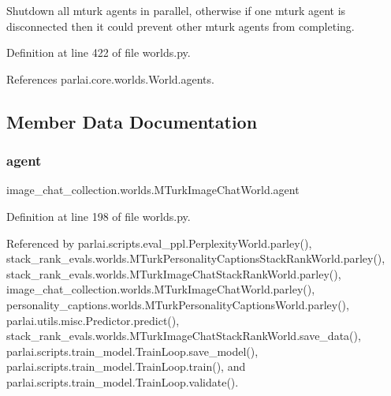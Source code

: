 \begin{DoxyVerb}Shutdown all mturk agents in parallel, otherwise if one mturk agent
is disconnected then it could prevent other mturk agents from
completing.
\end{DoxyVerb}
 

Definition at line 422 of file worlds.\+py.



References parlai.\+core.\+worlds.\+World.\+agents.



\subsection{Member Data Documentation}
\mbox{\label{classimage__chat__collection_1_1worlds_1_1MTurkImageChatWorld_a8a1e906514af9c95bb1e859400c79a7c}} 
\subsubsection{\texorpdfstring{agent}{agent}}
{\footnotesize\ttfamily image\+\_\+chat\+\_\+collection.\+worlds.\+M\+Turk\+Image\+Chat\+World.\+agent}



Definition at line 198 of file worlds.\+py.



Referenced by parlai.\+scripts.\+eval\+\_\+ppl.\+Perplexity\+World.\+parley(), stack\+\_\+rank\+\_\+evals.\+worlds.\+M\+Turk\+Personality\+Captions\+Stack\+Rank\+World.\+parley(), stack\+\_\+rank\+\_\+evals.\+worlds.\+M\+Turk\+Image\+Chat\+Stack\+Rank\+World.\+parley(), image\+\_\+chat\+\_\+collection.\+worlds.\+M\+Turk\+Image\+Chat\+World.\+parley(), personality\+\_\+captions.\+worlds.\+M\+Turk\+Personality\+Captions\+World.\+parley(), parlai.\+utils.\+misc.\+Predictor.\+predict(), stack\+\_\+rank\+\_\+evals.\+worlds.\+M\+Turk\+Image\+Chat\+Stack\+Rank\+World.\+save\+\_\+data(), parlai.\+scripts.\+train\+\_\+model.\+Train\+Loop.\+save\+\_\+model(), parlai.\+scripts.\+train\+\_\+model.\+Train\+Loop.\+train(), and parlai.\+scripts.\+train\+\_\+model.\+Train\+Loop.\+validate().

